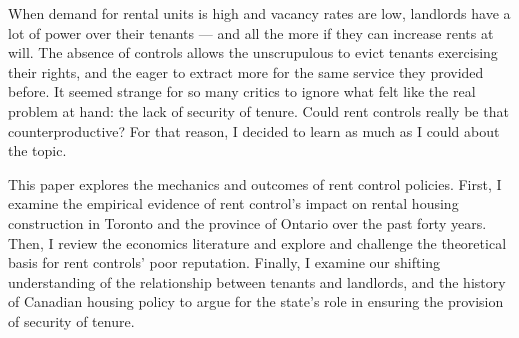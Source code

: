 When demand for rental units is high and vacancy rates are low, landlords have a lot of power over their tenants --- and all the more if they can increase rents at will. The absence of controls allows the unscrupulous to evict tenants exercising their rights, and the eager to extract more for the same service they provided before. It seemed strange for so many critics to ignore what felt like the real problem at hand: the lack of security of tenure. Could rent controls really be that counterproductive? For that reason, I decided to learn as much as I could about the topic.

This paper explores the mechanics and outcomes of rent control policies. First, I examine the empirical evidence of rent control's impact on rental housing construction in Toronto and the province of Ontario over the past forty years. Then, I review the economics literature and explore and challenge the theoretical basis for rent controls' poor reputation. Finally, I examine our shifting understanding of the relationship between tenants and landlords, and the history of Canadian housing policy to argue for the state's role in ensuring the provision of security of tenure.




